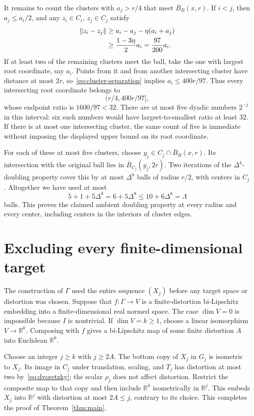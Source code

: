 \documentclass[11pt,a4paper]{article}
\theoremstyle{definition}
\theoremstyle{remark}
\numberwithin{equation}{section}
\newcommand{\norm}[1]{\lVert #1\rVert}
\newcommand{\cB}{\overline B}
\begin{document}
It remains to count the clusters with $a_j>r/4$ that meet $\cB_B(x,r)$. If $i<j$, then $a_j\le a_i/2$, and any $z_i\in C_i$, $z_j\in C_j$ satisfy
\begin{align}
 \norm{z_i-z_j}
 &\ge a_i-a_j-\eta(a_i+a_j)\notag\\
 &\ge \frac{1-3\eta}{2}a_i=\frac{97}{200}a_i.
 \label{eq:cluster-separation}
\end{align}
If at least two of the remaining clusters meet the ball, take the one with largest root coordinate, say $a_i$. Points from it and from another intersecting cluster have distance at most $2r$, so~\eqref{eq:cluster-separation} implies $a_i\le400r/97$. Thus every intersecting root coordinate belongs to
\[
 (r/4,400r/97],
\]
whose endpoint ratio is $1600/97<32$. There are at most five dyadic numbers $2^{-j}$ in this interval: six such numbers would have largest-to-smallest ratio at least $32$. If there is at most one intersecting cluster, the same count of five is immediate without imposing the displayed upper bound on its root coordinate.

For each of these at most five clusters, choose $y_j\in C_j\cap\cB_B(x,r)$. Its intersection with the original ball lies in $\cB_{C_j}(y_j,2r)$. Two iterations of the $\Delta^4$-doubling property cover this by at most $\Delta^8$ balls of radius $r/2$, with centers in $C_j$. Altogether we have used at most
\[
 5+1+5\Delta^8=6+5\Delta^8\le10+6\Delta^8=\Lambda
\]
balls. This proves the claimed ambient doubling property at every radius and every center, including centers in the interiors of cluster edges.

\section{Excluding every finite-dimensional target}
The construction of $\Gamma$ used the entire sequence $(X_j)$ before any target space or distortion was chosen. Suppose that $f:\Gamma\to V$ is a finite-distortion bi-Lipschitz embedding into a finite-dimensional real normed space. The case $\dim V=0$ is impossible because $I$ is nontrivial. If $\dim V=k\ge1$, choose a linear isomorphism $V\to\mathbb R^k$. Composing with $f$ gives a bi-Lipschitz map of some finite distortion $A$ into Euclidean $\mathbb R^k$.

Choose an integer $j\ge k$ with $j\ge2A$. The bottom copy of $X_j$ in $G_j$ is isometric to $X_j$. Its image in $C_j$ under translation, scaling, and $T_j$ has distortion at most two by~\eqref{eq:dvoretzky}; the scalar $\rho_j$ does not affect distortion. Restrict the composite map to that copy and then include $\mathbb R^k$ isometrically in $\mathbb R^j$. This embeds $X_j$ into $\mathbb R^j$ with distortion at most $2A\le j$, contrary to its choice. This completes the proof of Theorem~\ref{thm:main}.
\end{document}
